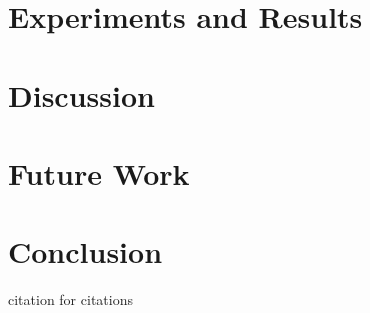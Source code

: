\documentclass[a4paper]{report}
\begin{document}
\chapter{Experiments and Results}
\label{chap:exp}


\chapter{Discussion}
\label{chap:discussion}

%
\chapter{Future Work}
\label{chap:future}

%
\chapter{Conclusion}




\newpage
citation for citations\cite{Bengtsson1995}




\newpage



% 
\end{document}
